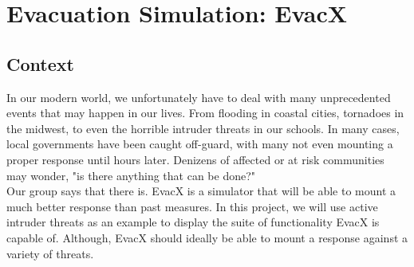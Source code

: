 \documentclass[12pt]{article}
\begin{document}
\section*{\huge Evacuation Simulation: EvacX}
\subsection*{Context}
\hspace*{6mm} In our modern world, we unfortunately have to deal with many unprecedented events that may happen in our lives. From flooding in coastal cities, tornadoes in the midwest, to even the horrible intruder threats in our schools. In many cases, local governments have been caught off-guard, with many not even mounting a proper response until hours later. Denizens of affected or at risk communities may wonder, "is there anything that can be done?" \\[5pt]
\hspace*{6mm} Our group says that there is. EvacX is a simulator that will be able to mount a much better response than past measures. In this project, we will use active intruder threats as an example to display the suite of functionality EvacX is capable of. Although, EvacX should ideally be able to mount a response against a variety of threats.
\end{document}
